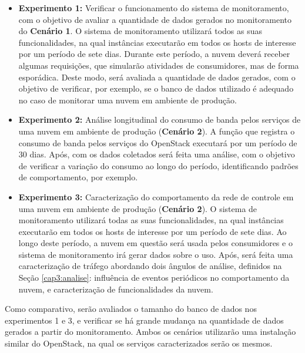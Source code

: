 \begin{itemize}
	\item \textbf{Experimento 1:} Verificar o funcionamento do sistema de monitoramento, com o objetivo de avaliar a quantidade de dados gerados no monitoramento do \textbf{Cenário 1}.
    O sistema de monitoramento utilizará todos as suas funcionalidades, na qual instâncias executarão em todos os hosts de interesse por um período de sete dias.
    Durante este período, a nuvem deverá receber algumas requisições, que simularão atividades de consumidores, mas de forma esporádica.
    Deste modo, será avaliada a quantidade de dados gerados, com o objetivo de verificar, por exemplo, se o banco de dados utilizado é adequado no caso de monitorar uma nuvem em ambiente de produção.
\end{itemize}

\begin{itemize}
	\item \textbf{Experimento 2:} Análise longitudinal do consumo de banda pelos serviços de uma nuvem em ambiente de produção (\textbf{Cenário 2}).
    A função que registra o consumo de banda pelos serviços do OpenStack executará por um período de 30 dias.
    Após, com os dados coletados será feita uma análise, com o objetivo de verificar a variação do consumo ao longo do período, identificando padrões de comportamento, por exemplo.
\end{itemize}

\begin{itemize}
	\item \textbf{Experimento 3:} Caracterização do comportamento da rede de controle em uma nuvem em ambiente de produção (\textbf{Cenário 2}).
    O sistema de monitoramento utilizará todas as suas funcionalidades, na qual instâncias executarão em todos os hosts de interesse por um período de sete dias.
    Ao longo deste período, a nuvem em questão será usada pelos consumidores e o sistema de monitoramento irá gerar dados sobre o uso.
    Após, será feita uma caracterização de tráfego abordando dois ângulos de análise, definidos na Seção \ref{cap3:analise}: influência de eventos periódicos no comportamento da nuvem, e caracterização de funcionalidades da nuvem.
\end{itemize}

	Como comparativo, serão avaliados o tamanho do banco de dados nos experimentos 1 e 3, e verificar se há grande mudança na quantidade de dados gerados a partir do monitoramento.
    Ambos os cenários utilizarão uma instalação similar do OpenStack, na qual os serviços caracterizados serão os mesmos.
    
